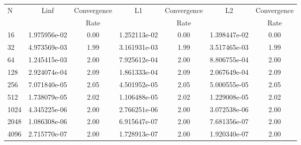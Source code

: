 \documentclass[12pt]{article}
\begin{document}
	\begin{tabular}{l|c|c|c|c|c|c}
		N&Linf&Convergence&L1&Convergence&L2&Convergence\\
		&&Rate&&Rate&&Rate\\
		\hline
		16&1.975956e-02&0.00&1.252113e-02&0.00&1.398447e-02&0.00\\
		\hline
		32&4.973569e-03&1.99&3.161931e-03&1.99&3.517465e-03&1.99\\
		\hline
		64&1.245415e-03&2.00&7.925612e-04&2.00&8.806755e-04&2.00\\
		\hline
		128&2.924074e-04&2.09&1.861333e-04&2.09&2.067649e-04&2.09\\
		\hline
		256&7.071840e-05&2.05&4.501952e-05&2.05&5.000555e-05&2.05\\
		\hline
		512&1.738079e-05&2.02&1.106488e-05&2.02&1.229008e-05&2.02\\
		\hline
		1024&4.345225e-06&2.00&2.766251e-06&2.00&3.072538e-06&2.00\\
		\hline
		2048&1.086308e-06&2.00&6.915647e-07&2.00&7.681356e-07&2.00\\
		\hline
		4096&2.715770e-07&2.00&1.728913e-07&2.00&1.920340e-07&2.00\\
	\end{tabular}
\end{document}
